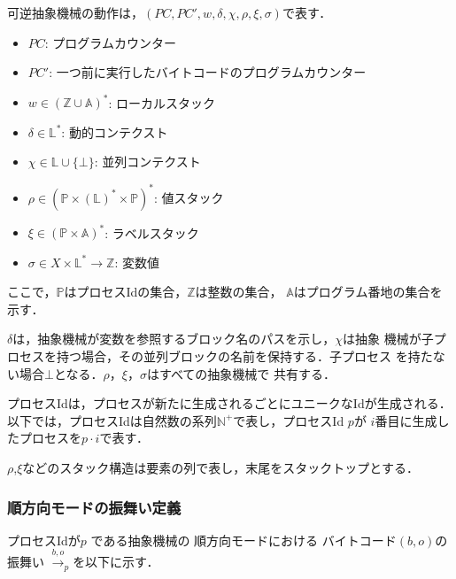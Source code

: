 \documentclass[submit,PRO]{ipsj}
\newtheorem{defn}[thm]{定義}
\begin{document}
可逆抽象機械の動作は，$(PC,PC',w,\delta,\chi,\rho,\xi,\sigma)$で表す．
\begin{itemize}
\item $PC$: プログラムカウンター
\item $PC'$: 一つ前に実行したバイトコードのプログラムカウンター
\item $w\in(\mathbb{Z}\cup\mathbb{A})^\ast$: ローカルスタック
\item $\delta\in\mathbb{L}^\ast$: 動的コンテクスト
\item $\chi\in \mathbb{L}\cup\{\bot\}$: 並列コンテクスト
\item $\rho\in(\mathbb{P}\times(\mathbb{L})^\ast\times\mathbb{P})^\ast$: 値スタック
\item $\xi\in(\mathbb{P}\times\mathbb{A})^\ast$: ラベルスタック
\item $\sigma\in X\times\mathbb{L}^\ast\rightarrow\mathbb{Z}$: 変数値
\end{itemize}
ここで，$\mathbb{P}$はプロセスIdの集合，$\mathbb{Z}$は整数の集合，
$\mathbb{A}$はプログラム番地の集合を示す．

$\delta$は，抽象機械が変数を参照するブロック名のパスを示し，$\chi$は抽象
機械が子プロセスを持つ場合，その並列ブロックの名前を保持する．子プロセス
を持たない場合$\bot$となる．$\rho$，$\xi$，$\sigma$はすべての抽象機械で
共有する．

プロセスIdは，プロセスが新たに生成されるごとにユニークなIdが生成される．
以下では，プロセスIdは自然数の系列$\mathbb{N}^+$で表し，プロセスId $p$が
$i$番目に生成したプロセスを$p\cdot i$で表す．

$\rho$,$\xi$などのスタック構造は要素の列で表し，末尾をスタックトップとする．

\subsubsection{順方向モードの振舞い定義}

プロセスIdが$p$ である抽象機械の%
順方向モードにおける%
バイトコード$(b,o)$の振舞い
$\xrightarrow{b,o}_{p}$を以下に示す．
\end{document}
